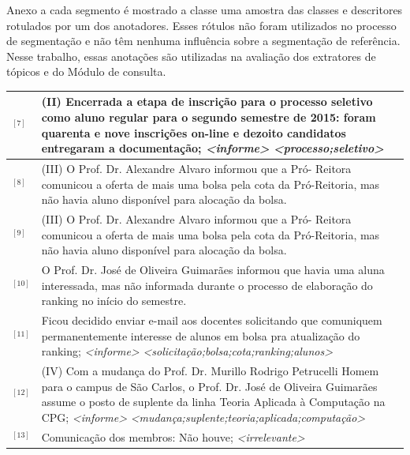 Anexo a cada segmento é mostrado a classe uma amostra das classes e descritores rotulados por um dos anotadores. Esses rótulos não foram utilizados no processo de segmentação e não têm nenhuma influência sobre a segmentação de referência. Nesse trabalho, essas anotações são utilizadas na avaliação dos extratores de tópicos e do Módulo de consulta.

\begin{table}[!h]
	\centering 
\footnotesize
	\begin{tabular}{|p{0.2cm}p{}|} \hline


$^{[7]}$&
(II) Encerrada a etapa de inscrição para o processo seletivo como aluno regular para o segundo semestre de 2015: foram quarenta e nove inscrições on-line e dezoito candidatos entregaram a documentação; 
\textit{<informe>} \textit{<processo;seletivo>}
\\ \hline


$^{[8]}$ &
(III) O Prof. Dr. Alexandre Alvaro informou que a Pró- Reitora comunicou a oferta de mais uma bolsa pela cota da Pró-Reitoria, mas não havia aluno disponível para alocação da bolsa.\\
$^{[9]}$ &
(III) O Prof. Dr. Alexandre Alvaro informou que a Pró- Reitora comunicou a oferta de mais uma bolsa pela cota da Pró-Reitoria, mas não havia aluno disponível para alocação da bolsa.\\
$^{[10]}$ &
O Prof. Dr. José de Oliveira Guimarães informou que havia uma aluna interessada, mas não informada durante o processo de elaboração do ranking no início do semestre.\\
$^{[11]}$ &
Ficou decidido enviar e-mail aos docentes solicitando que comuniquem permanentemente interesse de alunos em bolsa pra atualização do ranking;
\textit{<informe>} \textit{<solicitação;bolsa;cota;ranking;alunos>}
\\ \hline


$^{[12]}$ &
(IV) Com a mudança do Prof. Dr. Murillo Rodrigo Petrucelli Homem para o campus de São Carlos, o Prof. Dr. José de Oliveira Guimarães assume o posto de suplente da linha Teoria Aplicada à Computação na CPG;
\textit{<informe>} \textit{<mudança;suplente;teoria;aplicada;computação>}
\\ \hline

$^{[13]}$ &
	Comunicação dos membros: Não houve;
	\textit{<irrelevante>} 
\\ \hline




\end{tabular}
\end{table}
